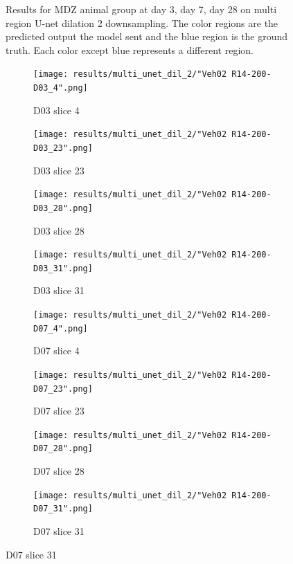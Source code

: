 \begin{figure}[!htb]
  \caption{Results for MDZ animal group at day 3, day 7, day 28 on multi region U-net dilation 2 downsampling. The color regions are the predicted output the model sent and the blue region is the ground truth. Each color except blue represents a different region.}
  \label{fig:results_multi_unetdil2_MDZ}
\end{figure}



\begin{figure}[!htb]  
    \centering %
\begin{subfigure}{0.25\textwidth}
  \texttt{[image: results/multi\_unet\_dil\_2/"Veh02 R14-200-D03\_4".png]}
  \caption{D03 slice 4}
\end{subfigure}\hfil %
\begin{subfigure}{0.25\textwidth}
  \texttt{[image: results/multi\_unet\_dil\_2/"Veh02 R14-200-D03\_23".png]}
  \caption{D03 slice 23}
\end{subfigure}\hfil %
\begin{subfigure}{0.25\textwidth}
  \texttt{[image: results/multi\_unet\_dil\_2/"Veh02 R14-200-D03\_28".png]}
  \caption{D03 slice 28}
\end{subfigure}\hfil %
\begin{subfigure}{0.25\textwidth}
  \texttt{[image: results/multi\_unet\_dil\_2/"Veh02 R14-200-D03\_31".png]}
  \caption{D03 slice 31}
\end{subfigure}

\medskip
\begin{subfigure}{0.25\textwidth}
  \texttt{[image: results/multi\_unet\_dil\_2/"Veh02 R14-200-D07\_4".png]}
  \caption{D07 slice 4}
\end{subfigure}\hfil %
\begin{subfigure}{0.25\textwidth}
  \texttt{[image: results/multi\_unet\_dil\_2/"Veh02 R14-200-D07\_23".png]}
  \caption{D07 slice 23}
\end{subfigure}\hfil %
\begin{subfigure}{0.25\textwidth}
  \texttt{[image: results/multi\_unet\_dil\_2/"Veh02 R14-200-D07\_28".png]}
  \caption{D07 slice 28}
\end{subfigure}\hfil %
\begin{subfigure}{0.25\textwidth}
  \texttt{[image: results/multi\_unet\_dil\_2/"Veh02 R14-200-D07\_31".png]}
  \caption{D07 slice 31}
\end{subfigure}


\end{figure}
